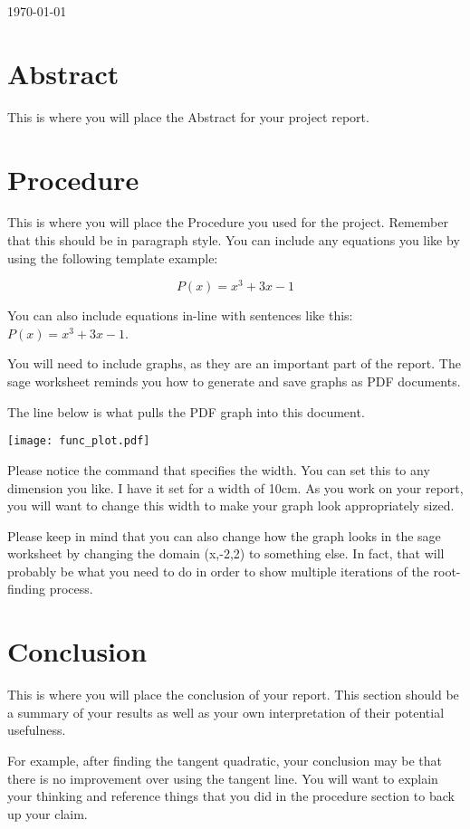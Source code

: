 \documentclass[11pt]{article}
\begin{document}
\today

\begin{report}
\section{Abstract}
This is where you will place the Abstract for your project report.

\section{Procedure}
This is where you will place the Procedure you used for the project. Remember that this should be in paragraph style. You can include any equations you like by using the following template example:

\[
    P(x) = x^3 + 3x - 1
\]

You can also include equations in-line with sentences like this: $P(x)=x^3+3x-1$.

You will need to include graphs, as they are an important part of the report. The sage worksheet reminds you how to generate and save graphs as PDF documents.

The line below is what pulls the PDF graph into this document.

\texttt{[image: func\_plot.pdf]}

Please notice the command that specifies the width. You can set this to any dimension you like. I have it set for a width of 10cm. As you work on your report, you will want to change this width to make your graph look appropriately sized.

Please keep in mind that you can also change how the graph looks in the sage worksheet by changing the domain (x,-2,2) to something else. In fact, that will probably be what you need to do in order to show multiple iterations of the root-finding process.

\section{Conclusion}
This is where you will place the conclusion of your report. This section should be a summary of your results as well as your own interpretation of their potential usefulness.

For example, after finding the tangent quadratic, your conclusion may be that there is no improvement over using the tangent line. You will want to explain your thinking and reference things that you did in the procedure section to back up your claim.

\end{report}
\end{document}
